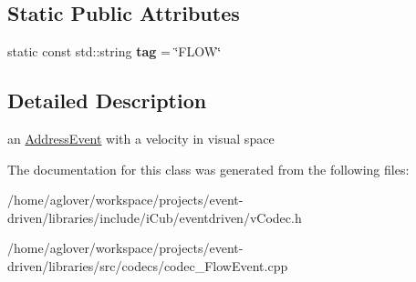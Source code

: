\subsection*{Static Public Attributes}
\begin{DoxyCompactItemize}
\item 
static const std\+::string {\bfseries tag} = \char`\"{}F\+L\+OW\char`\"{}\hypertarget{classev_1_1FlowEvent_a583ae9aaa6cbcbe1779eab526b5df1de}{}\label{classev_1_1FlowEvent_a583ae9aaa6cbcbe1779eab526b5df1de}

\end{DoxyCompactItemize}


\subsection{Detailed Description}
an \hyperlink{classev_1_1AddressEvent}{Address\+Event} with a velocity in visual space 

The documentation for this class was generated from the following files\+:\begin{DoxyCompactItemize}
\item 
/home/aglover/workspace/projects/event-\/driven/libraries/include/i\+Cub/eventdriven/v\+Codec.\+h\item 
/home/aglover/workspace/projects/event-\/driven/libraries/src/codecs/codec\+\_\+\+Flow\+Event.\+cpp\end{DoxyCompactItemize}
